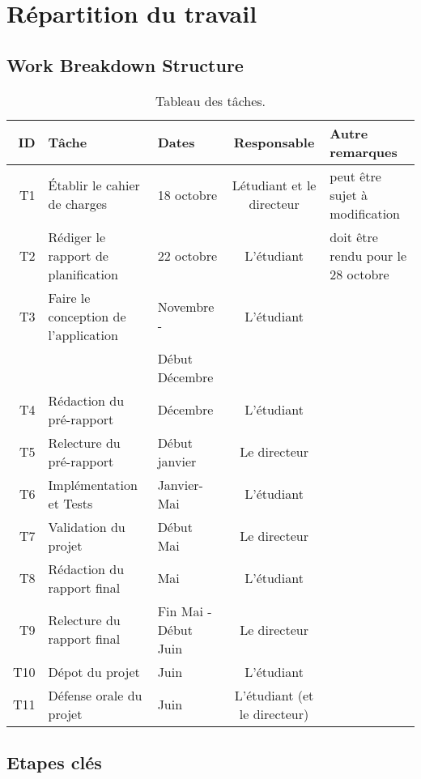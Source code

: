 \documentclass[runningheads]{llncs}
\begin{document}
\newpage
\section{R\'epartition du travail}

\subsection{Work Breakdown Structure}

\begin{table}[htbp]
\begin{center}
\begin{tabular}{|r|l||l|c|p{3cm}|}
\hline
\textbf{ID} & T\^ache & Dates & Responsable & Autre remarques\\
\hline\hline
T1 & Établir le cahier de charges & 18 octobre & L\'etudiant et le directeur & peut être sujet à modification \\
\hline
T2 & Rédiger le rapport de planification & 22 octobre & L'étudiant & doit être rendu pour le 28 octobre \\
\hline
T3 & Faire le conception de l'application & Novembre - & L'étudiant & \\ 
& & Début Décembre & & \\
\hline
T4 & Rédaction du pré-rapport & Décembre & L'étudiant & \\
\hline
T5 & Relecture du pr\'e-rapport & Début janvier &  Le directeur & \\
\hline
T6 & Implémentation et Tests & Janvier-Mai & L'étudiant & \\
\hline
T7 & Validation du projet & Début Mai & Le directeur & \\
\hline
T8 & Rédaction du rapport final & Mai & L'étudiant & \\
\hline
T9 & Relecture du rapport final & Fin Mai - Début Juin & Le directeur & \\
\hline
T10 & D\'epot du projet & Juin & L'étudiant & \\
\hline
T11 & D\'efense orale du projet & Juin & L'étudiant (et le directeur) & \\
\hline
\end{tabular}
\end{center}
   \caption{Tableau des t\^aches.}
   \label{tab:WBS}
\end{table}

\subsection{Etapes cl\'es }
\end{document}

